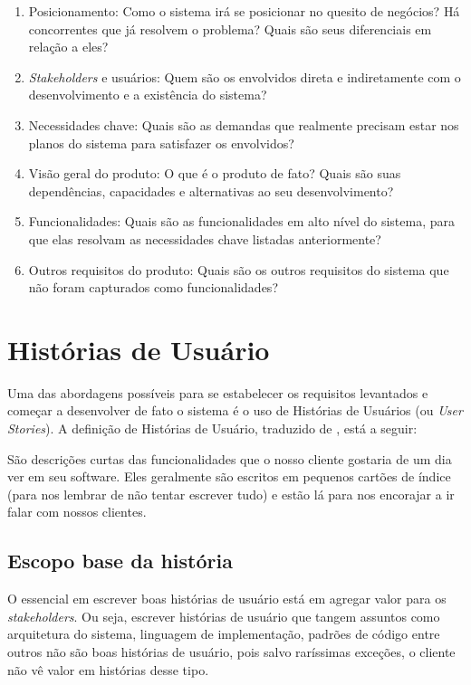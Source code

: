 \begin{enumerate}
    \item Posicionamento: Como o sistema irá se posicionar no quesito de negócios? Há concorrentes que já resolvem o problema? Quais são seus diferenciais em relação a eles?
    \item \textit{Stakeholders} e usuários: Quem são os envolvidos direta e indiretamente com o desenvolvimento e a existência do sistema?
    \item Necessidades chave: Quais são as demandas que realmente precisam estar nos planos do sistema para satisfazer os envolvidos?
    \item Visão geral do produto: O que é o produto de fato? Quais são suas dependências, capacidades e alternativas ao seu desenvolvimento?
    \item Funcionalidades: Quais são as funcionalidades em alto nível do sistema, para que elas resolvam as necessidades chave listadas anteriormente?
    \item Outros requisitos do produto: Quais são os outros requisitos do sistema que não foram capturados como funcionalidades?
\end{enumerate}

\section{Histórias de Usuário}

Uma das abordagens possíveis para se estabelecer os requisitos levantados e começar a desenvolver de fato o sistema é o uso de Histórias de Usuários (ou \textit{User Stories}). A definição de Histórias de Usuário, traduzido de \cite{jonathanrasmusson}, está a seguir:

\begin{citacaoLonga}
São descrições curtas das funcionalidades que o nosso cliente
gostaria de um dia ver em seu software. Eles geralmente são escritos em pequenos cartões de índice (para nos lembrar de não tentar escrever tudo) e estão lá para nos encorajar a ir falar com nossos clientes.
\end{citacaoLonga}

\subsection{Escopo base da história}
O essencial em escrever boas histórias de usuário está em agregar valor para os \textit{stakeholders}. Ou seja, escrever histórias de usuário que tangem assuntos como arquitetura do sistema, linguagem de implementação, padrões de código entre outros não são boas histórias de usuário, pois salvo raríssimas exceções, o cliente não vê valor em histórias desse tipo.

